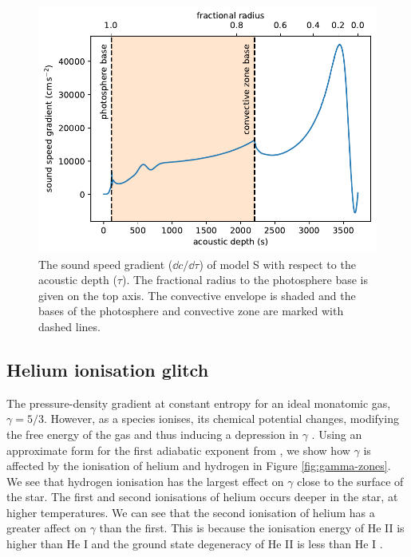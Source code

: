 \begin{figure}
    \centering
    \includegraphics{figures/sound-speed-gradient.pdf}
    \caption{The sound speed gradient (\(\dd c/\dd \tau\)) of model S with respect to the acoustic depth (\(\tau\)). The fractional radius to the photosphere base is given on the top axis. The convective envelope is shaded and the bases of the photosphere and convective zone are marked with dashed lines.}
    \label{fig:sound-speed-gradient}
\end{figure}

\subsection{Helium ionisation glitch}\label{sec:helium-glitch}

The pressure-density gradient at constant entropy for an ideal monatomic gas, \(\gamma = 5/3\). However, as a species ionises, its chemical potential changes, modifying the free energy of the gas and thus inducing a depression in \(\gamma\) . Using an approximate form for the first adiabatic exponent from \citet{Houdayer.Reese.ea2021}, we show how \(\gamma\) is affected by the ionisation of helium and hydrogen in Figure \ref{fig:gamma-zones}. We see that hydrogen ionisation has the largest effect on \(\gamma\) close to the surface of the star. The first and second ionisations of helium occurs deeper in the star, at higher temperatures. We can see that the second ionisation of helium has a greater affect on \(\gamma\) than the first. This is because the ionisation energy of He II is higher than He I and the ground state degeneracy of He II is less than He I .

